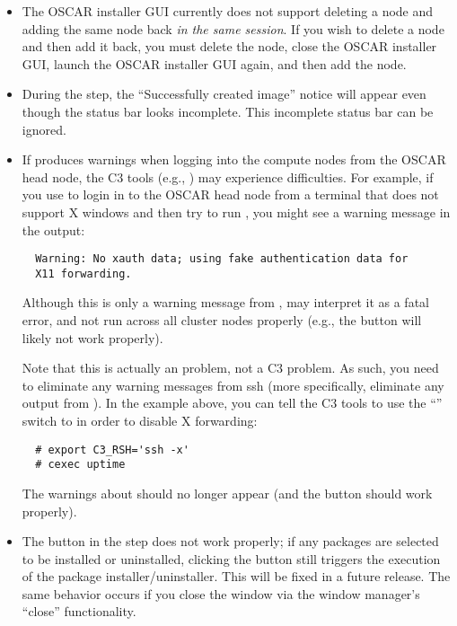 \begin{itemize}
\item The OSCAR installer GUI currently does not support deleting a
  node and adding the same node back {\em in the same session}.  If
  you wish to delete a node and then add it back, you must delete the
  node, close the OSCAR installer GUI, launch the OSCAR installer GUI
  again, and then add the node.

\item During the  step, the ``Successfully
  created image'' notice will appear even though the status bar looks
  incomplete.  This incomplete status bar can be ignored.

\begchange
\item If  produces warnings when logging into the compute
  nodes from the OSCAR head node, the C3 tools (e.g., ) may
  experience difficulties.  For example, if you use  to login
  in to the OSCAR head node from a terminal that does not support X
  windows and then try to run , you might see a warning
  message in the  output:

\begin{verbatim}
  Warning: No xauth data; using fake authentication data for 
  X11 forwarding.
\end{verbatim}
  
  Although this is only a warning message from , 
  may interpret it as a fatal error, and not run across all cluster
  nodes properly (e.g., the  button
  will likely not work properly).

  Note that this is actually an  problem, not a C3 problem.
  As such, you need to eliminate any warning messages from ssh (more
  specifically, eliminate any output from ).  In the
  example above, you can tell the C3 tools to use the ``''
  switch to  in order to disable X forwarding:

\begin{verbatim}
  # export C3_RSH='ssh -x'
  # cexec uptime
\end{verbatim}
  
  The warnings about  should no longer appear (and the
   button should work properly).
  
\item The  button in the  step does not work properly; if any packages are selected
  to be installed or uninstalled, clicking the  button
  still triggers the execution of the package installer/uninstaller.
  This will be fixed in a future release.  The same behavior occurs if
  you close the window via the window manager's ``close''
  functionality.


\end{itemize}
